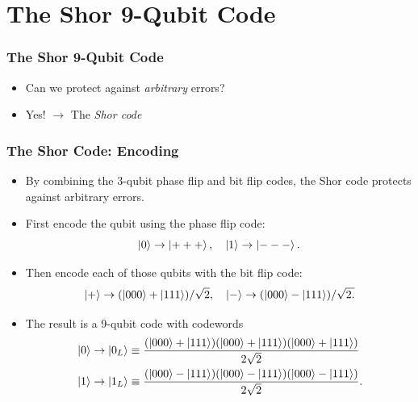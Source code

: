 \documentclass{beamer}
\begin{document}
\section{The Shor 9-Qubit Code}
\begin{frame}
    \frametitle{The Shor 9-Qubit Code}
    \begin{itemize}
        \item<1-> Can we protect against \textit{arbitrary} errors?
        \item<2-> Yes! $\longrightarrow$ The \textit{Shor code}
    \end{itemize}
\end{frame}

\begin{frame}
    \frametitle{The Shor Code: Encoding}
    \begin{itemize}
        \item<1-> By combining the 3-qubit phase flip and bit flip codes, the Shor code protects against arbitrary errors.
        \item<2-> First encode the qubit using the phase flip code: $$\left\vert{0}\right\rangle\rightarrow\left\vert{+++}\right\rangle,\quad \left\vert{1}\right\rangle\rightarrow\left\vert{---}\right\rangle.$$
        \item<3-> Then encode each of those qubits with the bit flip code: $$\left\vert{+}\right\rangle\rightarrow (\left\vert{000}\right\rangle+\left\vert{111}\right\rangle)/\sqrt{2},\quad \left\vert{-}\right\rangle\rightarrow (\left\vert{000}\right\rangle-\left\vert{111}\right\rangle)/\sqrt{2.}$$
        \item<4-> The result is a 9-qubit code with codewords 
        \begin{align*}
            & \left\vert{0}\right\rangle \rightarrow \left\vert{0_L}\right\rangle \equiv \frac{(\left\vert{000}\right\rangle + \left\vert{111}\right\rangle)(\left\vert{000}\right\rangle + \left\vert{111}\right\rangle)(\left\vert{000}\right\rangle + \left\vert{111}\right\rangle)}{2\sqrt{2}}\\
            & \left\vert{1}\right\rangle\rightarrow \left\vert{1_L}\right\rangle \equiv \frac{(\left\vert{000}\right\rangle - \left\vert{111}\right\rangle)(\left\vert{000}\right\rangle - \left\vert{111}\right\rangle)(\left\vert{000}\right\rangle - \left\vert{111}\right\rangle)}{2\sqrt{2}}.
        \end{align*}
    \end{itemize}
\end{frame}

    
\end{document}
